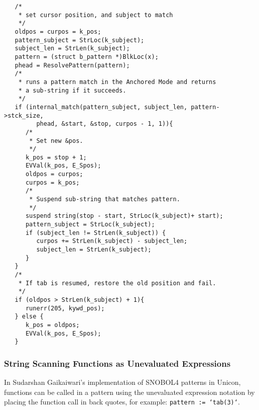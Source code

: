 \documentclass{article}
\begin{document}
\begin{verbatim}
   /*
    * set cursor position, and subject to match
    */
   oldpos = curpos = k_pos;
   pattern_subject = StrLoc(k_subject);
   subject_len = StrLen(k_subject);
   pattern = (struct b_pattern *)BlkLoc(x);
   phead = ResolvePattern(pattern);
   /*
    * runs a pattern match in the Anchored Mode and returns
    * a sub-string if it succeeds.
    */	
   if (internal_match(pattern_subject, subject_len, pattern->stck_size,
         phead, &start, &stop, curpos - 1, 1)){
      /*
       * Set new &pos.
       */ 
      k_pos = stop + 1;
      EVVal(k_pos, E_Spos);	
      oldpos = curpos;
      curpos = k_pos;
      /*
       * Suspend sub-string that matches pattern.
       */
      suspend string(stop - start, StrLoc(k_subject)+ start);
      pattern_subject = StrLoc(k_subject);
      if (subject_len != StrLen(k_subject)) {
         curpos += StrLen(k_subject) - subject_len;
         subject_len = StrLen(k_subject);
      }
   }
   /*
    * If tab is resumed, restore the old position and fail.
    */
   if (oldpos > StrLen(k_subject) + 1){
      runerr(205, kywd_pos);
   } else {
      k_pos = oldpos;
      EVVal(k_pos, E_Spos);
   }
\end{verbatim}

\subsubsection{String Scanning Functions as Unevaluated Expressions}
In Sudarshan Gaikaiwari's implementation of SNOBOL4 patterns in Unicon, functions can be called in a pattern using the unevaluated expression notation by placing the function call in back quotes, for example: \texttt{pattern := `tab(3)`}.
\end{document}
